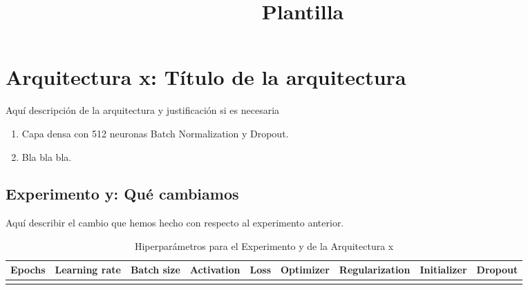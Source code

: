 \documentclass{article}
\begin{document}
\title{Plantilla}

\author{{}}

\date{}
\maketitle



	\section{Arquitectura x: T\'itulo de la arquitectura}
	\label{n-s-ax} %
		Aqu\'i descripci\'on de la arquitectura y justificaci\'on si es necesaria
		\begin{enumerate}
			\item Capa densa con 512 neuronas Batch Normalization y Dropout.
			\item Bla bla bla.
		\end{enumerate}
		
		\subsection{Experimento y: Qu\'e cambiamos}
		\label{n-s-ax-ey} %
			Aqu\'i describir el cambio que hemos hecho con respecto al experimento anterior.
			
			\begin{table}[!h]
				\begin{center}
					\begin{tabular}{| c | c | c | c | c | c | c | c | c |}
						\textbf{Epochs} & \textbf{Learning rate} & \textbf{Batch size} & \textbf{Activation} & \textbf{Loss} & \textbf{Optimizer} & \textbf{Regularization} & \textbf{Initializer} & \textbf{Dropout}\\ \hline
						 &  &  &  &  &  &  &  &
					\end{tabular}
					\caption{Hiperpar\'ametros para el Experimento y de la Arquitectura x}
					\label{tab:hip-n-ax-ey}
				\end{center}
			\end{table}
			
\end{document}
